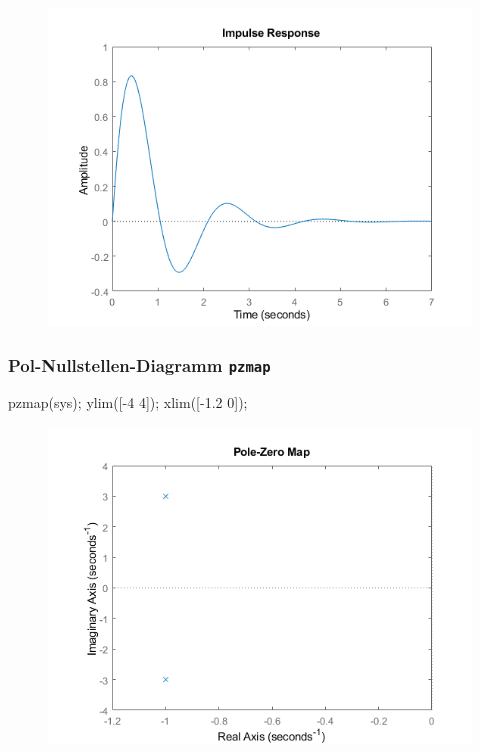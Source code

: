 \documentclass[
  10pt,
  a4paper,
]{article}
\newenvironment{Shaded}{}{}
\newcommand{\FloatTok}[1]{\textcolor[rgb]{0.00,0.36,0.77}{#1}}
\newcommand{\NormalTok}[1]{\textcolor[rgb]{0.14,0.16,0.18}{#1}}
\newcommand{\OperatorTok}[1]{\textcolor[rgb]{0.14,0.16,0.18}{#1}}
\newcommand{\VariableTok}[1]{\textcolor[rgb]{0.89,0.38,0.04}{#1}}
\numberwithin{equation}{section}
\begin{document}
\begin{multicols}{2}
\begin{figure}[H]
{\centering \includegraphics{images/matlab_ImpulseResponsePlot.png}

}

\end{figure}

\hypertarget{pol-nullstellen-diagramm-pzmap}{%
\subsubsection{\texorpdfstring{Pol-Nullstellen-Diagramm
\texttt{pzmap}}{Pol-Nullstellen-Diagramm pzmap}}\label{pol-nullstellen-diagramm-pzmap}}

\begin{Shaded}
\begin{Highlighting}[]
\VariableTok{pzmap}\NormalTok{(}\VariableTok{sys}\NormalTok{)}\OperatorTok{;}
\VariableTok{ylim}\NormalTok{([}\OperatorTok{{-}}\FloatTok{4} \FloatTok{4}\NormalTok{])}\OperatorTok{;} \VariableTok{xlim}\NormalTok{([}\OperatorTok{{-}}\FloatTok{1.2} \FloatTok{0}\NormalTok{])}\OperatorTok{;}
\end{Highlighting}
\end{Shaded}

\begin{figure}[H]

{\centering \includegraphics{images/matlab_PoleZeroMap.png}

}
\end{figure}
\end{multicols}
\end{document}
